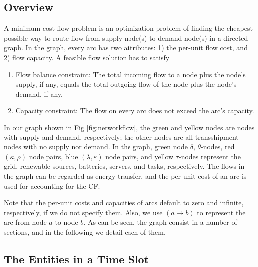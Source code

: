 \documentclass[conference, 10pt, ﬁnal, letterpaper, twocolumn]{IEEEtran}
\begin{document}
\subsection{Overview}
A minimum-cost flow problem is an optimization problem of finding the cheapest possible way to route flow from supply node(s) to demand node(s) in a directed graph. In the graph, every arc has two attributes: 1) the per-unit flow cost, and 2) flow capacity. A feasible flow solution has to satisfy
\begin{enumerate}
    \item Flow balance constraint: The total incoming flow to a node plus the node's supply, if any, equals the total outgoing flow of the node plus the node's demand, if any. 
    \item Capacity constraint: The flow on every arc does not exceed the arc's capacity.
\end{enumerate}

In our graph shown in Fig \ref{fig:networkflow}, the green and yellow nodes are nodes with supply and demand, respectively; the other nodes are all transshipment nodes with no supply nor demand. In the graph, green node $\delta$, $\theta$-nodes, red $(\kappa, \rho)$ node pairs, blue $(\lambda, \varepsilon)$ node pairs, and yellow $\tau$-nodes represent the grid, renewable sources, batteries, servers, and tasks, respectively. The flows in the graph can be regarded as energy transfer, and the per-unit cost of an arc is used for accounting for the CF.

Note that the per-unit costs and capacities of arcs default to zero and infinite, respectively, if we do not specify them. Also, we use $(a\rightarrow b)$ to represent the arc from node $a$ to node $b$. As can be seen, the graph consist in a number of sections, and in the following we detail each of them.

\subsection{The Entities in a Time Slot} \label{sub-A}
\end{document}
